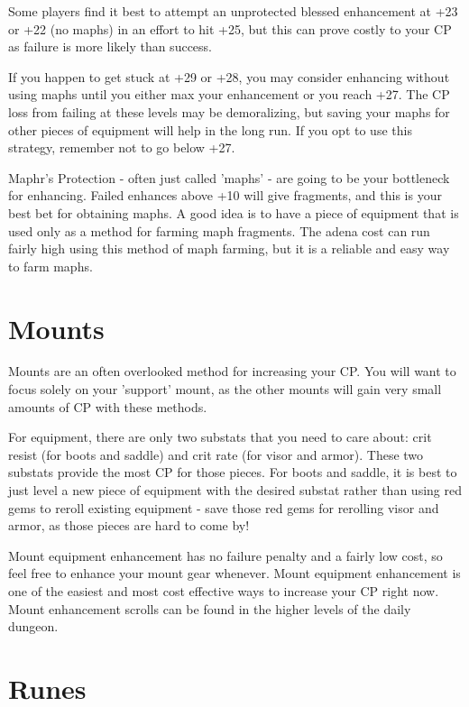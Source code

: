 \documentclass[]{article}
\begin{document}
 Some players find it best to attempt an unprotected blessed enhancement at +23 or +22 (no maphs) in an effort to hit +25, but this can prove costly to your CP as failure is more likely than success.
 
 If you happen to get stuck at +29 or +28, you may consider enhancing without using maphs until you either max your enhancement or you reach +27.
 The CP loss from failing at these levels may be demoralizing, but saving your maphs for other pieces of equipment will help in the long run.
 If you opt to use this strategy, remember not to go below +27.
 
 Maphr's Protection - often just called 'maphs' - are going to be your bottleneck for enhancing.
 Failed enhances above +10 will give fragments, and this is your best bet for obtaining maphs.
 A good idea is to have a piece of equipment that is used only as a method for farming maph fragments.
 The adena cost can run fairly high using this method of maph farming, but it is a reliable and easy way to farm maphs.

\section{Mounts}

Mounts are an often overlooked method for increasing your CP.
You will want to focus solely on your 'support' mount, as the other mounts will gain very small amounts of CP with these methods.

For equipment, there are only two substats that you need to care about: crit resist (for boots and saddle) and crit rate (for visor and armor).
These two substats provide the most CP for those pieces.
For boots and saddle, it is best to just level a new piece of equipment with the desired substat rather than using red gems to reroll existing equipment - save those red gems for rerolling visor and armor, as those pieces are hard to come by!

Mount equipment enhancement has no failure penalty and a fairly low cost, so feel free to enhance your mount gear whenever.
Mount equipment enhancement is one of the easiest and most cost effective ways to increase your CP right now.
Mount enhancement scrolls can be found in the higher levels of the daily dungeon.

\section{Runes}
\end{document}
